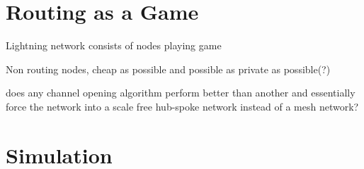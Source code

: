\section{Routing as a Game}

Lightning network consists of nodes playing game

Non routing nodes, cheap as possible and possible as private as possible(?) 

does any channel opening algorithm perform better than another and essentially force the network into a scale free hub-spoke network instead of a mesh network?

\section{Simulation}



